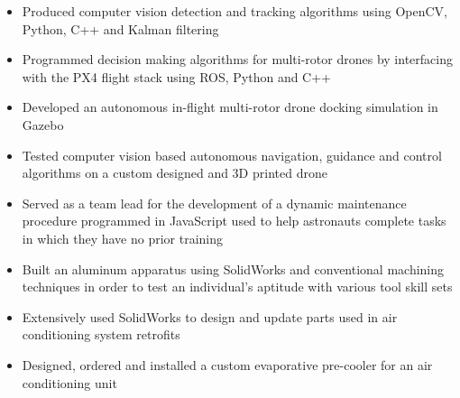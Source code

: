 \documentclass[10pt,ragged2e]{altacv}
\begin{document}

\begin{fullwidth}
  \makecvheader
\end{fullwidth}



\begin{itemize}
  \item Produced computer vision detection and tracking algorithms using OpenCV, Python, C++ and Kalman filtering
  \item Programmed decision making algorithms for multi-rotor drones by interfacing with the PX4 flight stack using ROS, Python and C++ 
  \item Developed an autonomous in-flight multi-rotor drone docking simulation in Gazebo
  \item Tested computer vision based autonomous navigation, guidance and control algorithms on a custom designed and 3D printed drone
\end{itemize}

\begin{itemize}
  \item Served as a team lead for the development of a dynamic maintenance procedure programmed in JavaScript used to help astronauts complete tasks in which they have no prior training 
  \item Built an aluminum apparatus using SolidWorks and conventional machining techniques in order to test an individual’s aptitude with various tool skill sets
\end{itemize}

\divider

\begin{itemize}
  \item Extensively used SolidWorks to design and update parts used in air conditioning system retrofits
  \item Designed, ordered and installed a custom evaporative pre-cooler for an air conditioning unit
\end{itemize}
\end{document}
